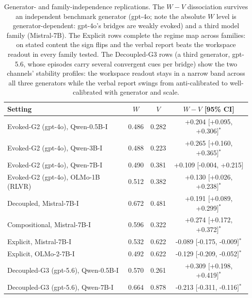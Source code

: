 \begin{table}[h]
\centering
\caption{Generator- and family-independence replications. The $W{-}V$ dissociation
survives an independent benchmark generator (gpt-4o; note the absolute $W$ level
is generator-dependent: gpt-4o's bridges are weakly evoked) and a third model
family (Mistral-7B). The Explicit rows complete the regime map across
families: on stated content the sign flips and the verbal report beats the
workspace readout in every family tested. The Decoupled-G3 rows (a third
generator, gpt-5.6, whose episodes carry several convergent cues per bridge)
show the two channels' stability profiles: the workspace readout stays in a
narrow band across all three generators while the verbal report swings from
anti-calibrated to well-calibrated with generator and scale.}
\label{tab:appA10}
\small
\begin{tabular}{lccc}
\toprule
Setting & $W$ & $V$ & $W-V$ [95\% CI] \\
\midrule
Evoked-G2 (gpt-4o), Qwen-0.5B-I & 0.486 & 0.282 & +0.204 [+0.095, +0.306]$^{*}$ \\
Evoked-G2 (gpt-4o), Qwen-3B-I & 0.488 & 0.223 & +0.265 [+0.160, +0.365]$^{*}$ \\
Evoked-G2 (gpt-4o), Qwen-7B-I & 0.490 & 0.381 & +0.109 [-0.004, +0.215] \\
Evoked-G2 (gpt-4o), OLMo-1B (RLVR) & 0.512 & 0.382 & +0.130 [+0.026, +0.238]$^{*}$ \\
Decoupled, Mistral-7B-I & 0.672 & 0.481 & +0.191 [+0.089, +0.299]$^{*}$ \\
Compositional, Mistral-7B-I & 0.596 & 0.322 & +0.274 [+0.172, +0.372]$^{*}$ \\
Explicit, Mistral-7B-I & 0.532 & 0.622 & -0.089 [-0.175, -0.009]$^{*}$ \\
Explicit, OLMo-2-7B-I & 0.492 & 0.622 & -0.129 [-0.209, -0.052]$^{*}$ \\
Decoupled-G3 (gpt-5.6), Qwen-0.5B-I & 0.570 & 0.261 & +0.309 [+0.198, +0.419]$^{*}$ \\
Decoupled-G3 (gpt-5.6), Qwen-7B-I & 0.664 & 0.878 & -0.213 [-0.311, -0.116]$^{*}$ \\
\bottomrule
\end{tabular}
\end{table}
